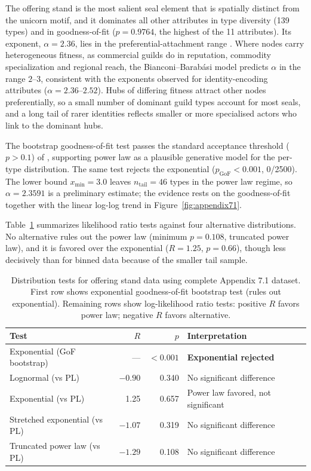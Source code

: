 \documentclass[12pt]{article}
\begin{document}
The offering stand is the most salient seal element that is spatially distinct
from the unicorn motif, and it dominates all other attributes in type diversity
(139 types) and in goodness-of-fit ($p = 0.9764$, the highest of the 11
attributes). Its exponent, $\alpha = 2.36$, lies in the preferential-attachment
range \citep{barabasi1999emergence}. Where nodes carry heterogeneous
fitness, as commercial guilds do in reputation, commodity specialization and
regional reach, the Bianconi--Barab{\'a}si model \citep{bianconi2001competition}
predicts $\alpha$ in the range $2$--$3$, consistent with the exponents observed
for identity-encoding attributes ($\alpha = 2.36$--$2.52$). Hubs of differing
fitness attract other nodes preferentially, so a small number of dominant guild
types account for most seals, and a long tail of rarer identities reflects
smaller or more specialised actors who link to the dominant hubs.

The bootstrap goodness-of-fit test passes the standard acceptance threshold
($p > 0.1$) of \citet{clauset2009power}, supporting power law as a plausible
generative model for the per-type distribution. The same test rejects the
exponential ($p_{\text{GoF}} < 0.001$, 0/2500). The lower bound $x_{\min} = 3.0$
leaves $n_{\text{tail}} = 46$ types in the power law regime, so
$\alpha = 2.3591$ is a preliminary estimate; the evidence rests on the
goodness-of-fit together with the linear log-log trend in
Figure~\ref{fig:appendix71}.

Table~\ref{tab:appendix_compare} summarizes likelihood ratio tests against four
alternative distributions. No alternative rules out the power law (minimum
$p = 0.108$, truncated power law), and it is favored over the exponential
($R = 1.25$, $p = 0.66$), though less decisively than for binned data because of
the smaller tail sample.

\begin{table}[H]
\centering
\caption{Distribution tests for offering stand data using complete Appendix 7.1 dataset.
First row shows exponential goodness-of-fit bootstrap test (rules out exponential).
Remaining rows show log-likelihood ratio tests: positive $R$ favors power law; negative $R$ favors alternative.}
\label{tab:appendix_compare}
\begin{tabular}{@{}lrrl@{}}
\toprule
Test & $R$ & $p$ & Interpretation \\
\midrule
Exponential (GoF bootstrap) & — & $<0.001$ & \textbf{Exponential rejected} \\
\midrule
Lognormal (vs PL) & $-0.90$ & 0.340 & No significant difference \\
Exponential (vs PL) & 1.25 & 0.657 & Power law favored, not significant \\
Stretched exponential (vs PL) & $-1.07$ & 0.319 & No significant difference \\
Truncated power law (vs PL) & $-1.29$ & 0.108 & No significant difference \\
\bottomrule
\end{tabular}
\end{table}
\end{document}
